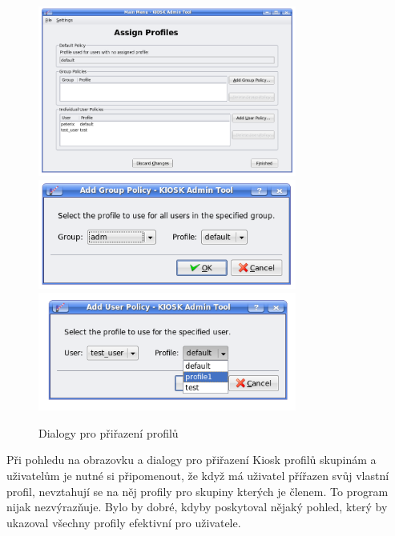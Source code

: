 \begin{figure}[h]
    \centering
    \includegraphics[width=8.5cm]{obrazky/KioskToolKDE3/prirazeni_profilu.png}
    \includegraphics[width=8.5cm]{obrazky/KioskToolKDE3/prirazeni_profilu_skupine.png}
    \includegraphics[width=8.5cm]{obrazky/KioskToolKDE3/prirazeni_profilu_uzivateli.png}
    \caption{Dialogy pro přiřazení profilů}
    \label{fig:kt3_prirazeni}
\end{figure}
Při pohledu na obrazovku a dialogy pro přiřazení Kiosk profilů skupinám
a uživatelům je nutné si připomenout, že když má uživatel přířazen svůj vlastní
profil, nevztahují se na něj profily pro skupiny kterých je členem. To program
nijak nezvýrazňuje. Bylo by dobré, kdyby poskytoval nějaký pohled, který by
ukazoval všechny profily efektivní pro uživatele.

